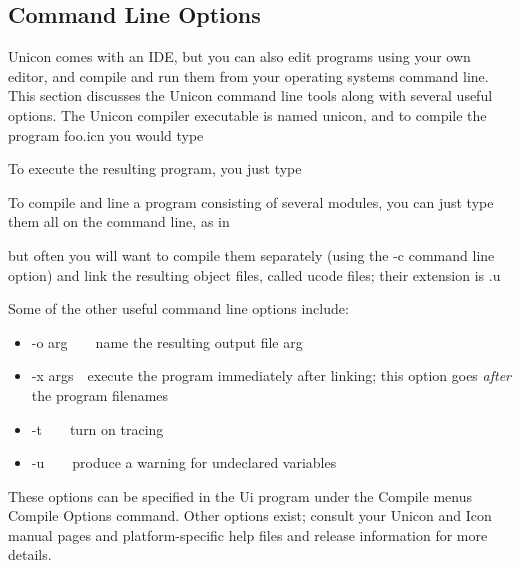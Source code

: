 \subsection{Command Line Options}
Unicon comes with an IDE, but you can also edit programs using your own
editor, and compile and run them from your operating
system{\textquotesingle}s command line. This section discusses the
Unicon command line tools along with several useful options. The Unicon
compiler executable is named unicon, and to compile the program foo.icn
you would type


To execute the resulting program, you just type


To compile and line a program consisting of several modules, you can
just type them all on the command line, as in


\noindent but often you will want to compile them separately
(using the -c command line option) and link the resulting object
files, called ucode files; their extension is .u


Some of the other useful command line options include:

\begin{itemize}
\item \textsf{{}-o arg}\ \ \ \ name the resulting output file arg
\item \textsf{{}-x args}\ \ execute the program immediately after linking;
		 this option goes \textit{after} the program filenames
\item \textsf{{}-t}\ \ \ \ turn on tracing
\item \textsf{{}-u}\ \ \ \ produce a warning for undeclared variables
\end{itemize}

These options can be specified in the Ui program under the Compile
menu{\textquotesingle}s Compile Options command. Other options exist;
consult your Unicon and Icon manual pages and platform-specific help
files and release information for more details.

